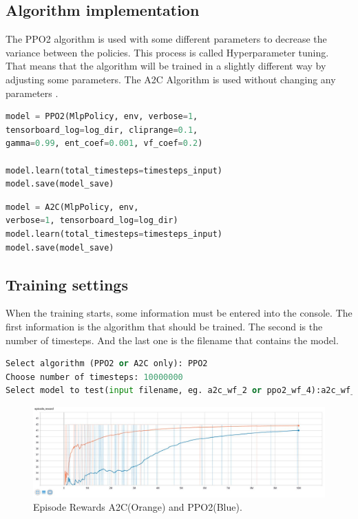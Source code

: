 \documentclass[sigconf]{acmart}
\begin{document}
 \subsection{Algorithm implementation}
 The PPO2 algorithm is used with some different parameters to decrease the variance between the policies.
 This process is called Hyperparameter tuning. 
 That means that the algorithm will be trained in a slightly different way by adjusting some parameters. The A2C Algorithm is used without changing any parameters \cite[5-7]{schulman2017proximal}.
 
 \begin{lstlisting}[language=Python, caption=PPO2 implementation]
model = PPO2(MlpPolicy, env, verbose=1, 
tensorboard_log=log_dir, cliprange=0.1, 
gamma=0.99, ent_coef=0.001, vf_coef=0.2)

model.learn(total_timesteps=timesteps_input)
model.save(model_save)
 \end{lstlisting}
 \vspace{2.5mm}

 \begin{lstlisting}[language=Python, caption=A2C implementation]
model = A2C(MlpPolicy, env, 
verbose=1, tensorboard_log=log_dir)
model.learn(total_timesteps=timesteps_input)
model.save(model_save)
 \end{lstlisting}
 \vspace{2.5mm}
 
 \subsection{Training settings}
 When the training starts, some information must be entered into the console.
 The first information is the algorithm that should be trained.
 The second is the number of timesteps.
 And the last one is the filename that contains the model.
 
\begin{lstlisting}[language=Python, caption=Console output before start]
Select algorithm (PPO2 or A2C only): PPO2
Choose number of timesteps: 10000000
Select model to test(input filename, eg. a2c_wf_2 or ppo2_wf_4):a2c_wf_3
\end{lstlisting}


\begin{figure}
 \centering
  \includegraphics[width=\textwidth]{episode_reward_big} 
  \caption{Episode Rewards A2C(Orange) and PPO2(Blue).}
  \label{fig:reward1}
\end{figure}
 
\end{document}
